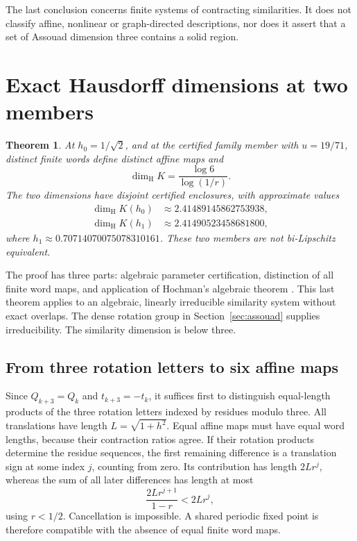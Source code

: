 \documentclass[11pt,a4paper]{article}
\newtheorem{theorem}{Theorem}[section]
\theoremstyle{definition}\newtheorem{definition}[theorem]{Definition}
\theoremstyle{remark}\newtheorem{remark}[theorem]{Remark}
\newcommand{\dimH}{\dim_{\mathrm H}}\newcommand{\dimA}{\dim_{\mathrm A}}
\begin{document}
The last conclusion concerns finite systems of contracting similarities.
It does not classify affine, nonlinear or graph-directed descriptions, nor
does it assert that a set of Assouad dimension three contains a solid region.

\section{Exact Hausdorff dimensions at two members}\label{sec:exact}
\begin{theorem}\label{thm:exact}
At $h_0=1/\sqrt2$, and at the certified family member with $u=19/71$, distinct finite
words define distinct affine maps and
\[
\dimH K=\frac{\log6}{\log(1/r)}.
\]
The two dimensions have disjoint certified enclosures, with approximate values
\begin{align*}
\dimH K(h_0)&\approx2.41489145862753938,\\
\dimH K(h_1)&\approx2.41490523458681800,
\end{align*}
where $h_1\approx0.70714070075078310161$. These two members are not bi-Lipschitz
equivalent.
\end{theorem}

The proof has three parts: algebraic parameter certification, distinction of
all finite word maps, and application of Hochman's algebraic theorem
\cite[Corollary 1.7]{hochman}. This last theorem applies to an algebraic,
linearly irreducible similarity system without exact overlaps. The dense
rotation group in Section~\ref{sec:assouad} supplies irreducibility. The
similarity dimension is below three.

\subsection{From three rotation letters to six affine maps}\label{sec:signs}
Since $Q_{k+3}=Q_k$ and $t_{k+3}=-t_k$, it suffices first to distinguish
equal-length products of the three rotation letters indexed by residues
modulo three. All translations have length $L=\sqrt{1+h^2}$.
Equal affine maps must have equal word lengths, because their contraction
ratios agree. If their rotation products determine the residue sequences,
the first remaining difference is a translation sign at some index $j$,
counting from zero. Its contribution has length $2Lr^j$, whereas the sum of
all later differences has length at most
\[
\frac{2Lr^{j+1}}{1-r}<2Lr^j,
\]
using $r<1/2$. Cancellation is impossible. A shared periodic fixed point is
therefore compatible with the absence of equal finite word maps.
\end{document}
